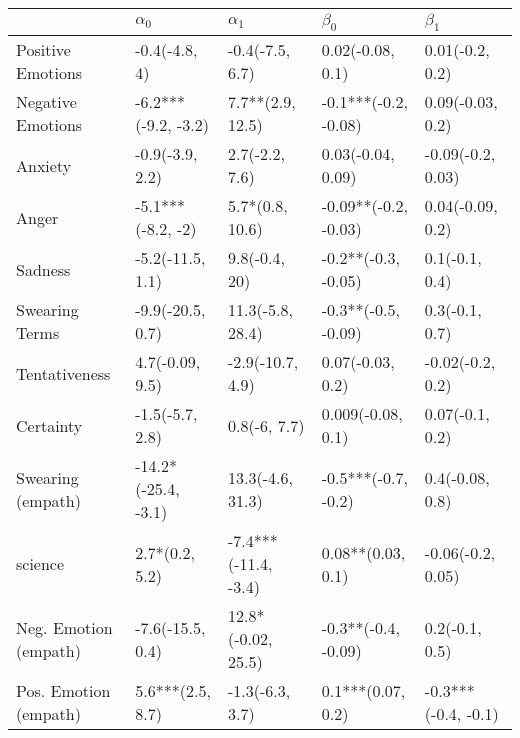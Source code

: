 \begin{tabular}{lllll}
\toprule
{} &           $\alpha_0$ &            $\alpha_1$ &             $\beta_0$ &            $\beta_1$ \\
\midrule
Positive Emotions     &        -0.4(-4.8, 4) &       -0.4(-7.5, 6.7) &      0.02(-0.08, 0.1) &      0.01(-0.2, 0.2) \\
Negative Emotions     &  -6.2***(-9.2, -3.2) &      7.7**(2.9, 12.5) &  -0.1***(-0.2, -0.08) &     0.09(-0.03, 0.2) \\
Anxiety               &      -0.9(-3.9, 2.2) &        2.7(-2.2, 7.6) &     0.03(-0.04, 0.09) &    -0.09(-0.2, 0.03) \\
Anger                 &    -5.1***(-8.2, -2) &       5.7*(0.8, 10.6) &  -0.09**(-0.2, -0.03) &     0.04(-0.09, 0.2) \\
Sadness               &     -5.2(-11.5, 1.1) &         9.8(-0.4, 20) &   -0.2**(-0.3, -0.05) &       0.1(-0.1, 0.4) \\
Swearing Terms        &     -9.9(-20.5, 0.7) &      11.3(-5.8, 28.4) &   -0.3**(-0.5, -0.09) &       0.3(-0.1, 0.7) \\
Tentativeness         &      4.7(-0.09, 9.5) &      -2.9(-10.7, 4.9) &      0.07(-0.03, 0.2) &     -0.02(-0.2, 0.2) \\
Certainty             &      -1.5(-5.7, 2.8) &          0.8(-6, 7.7) &     0.009(-0.08, 0.1) &      0.07(-0.1, 0.2) \\
Swearing (empath)     &  -14.2*(-25.4, -3.1) &      13.3(-4.6, 31.3) &   -0.5***(-0.7, -0.2) &      0.4(-0.08, 0.8) \\
science               &       2.7*(0.2, 5.2) &  -7.4***(-11.4, -3.4) &     0.08**(0.03, 0.1) &    -0.06(-0.2, 0.05) \\
Neg. Emotion (empath) &     -7.6(-15.5, 0.4) &    12.8*(-0.02, 25.5) &   -0.3**(-0.4, -0.09) &       0.2(-0.1, 0.5) \\
Pos. Emotion (empath) &     5.6***(2.5, 8.7) &       -1.3(-6.3, 3.7) &     0.1***(0.07, 0.2) &  -0.3***(-0.4, -0.1) \\
\bottomrule
\end{tabular}
